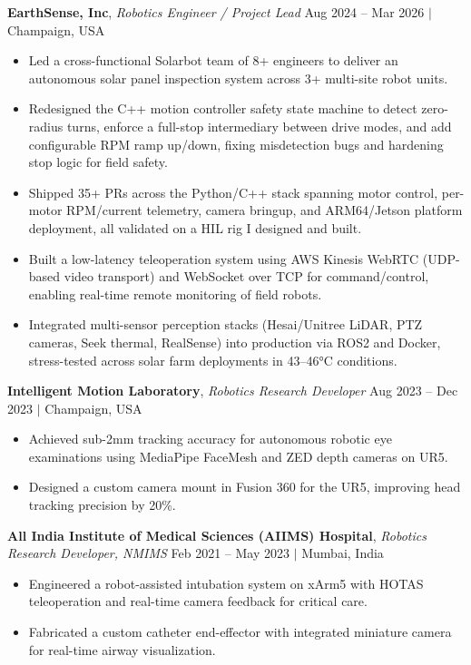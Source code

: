 \documentclass[9pt, a4paper]{article}
\newcommand{\workheader}[3]{%
  \textbf{#1}, \textit{#2} \hfill #3%
}
\begin{document}
\workheader{EarthSense, Inc}{Robotics Engineer / Project Lead}{Aug 2024 – Mar 2026 $|$ Champaign, USA}
\begin{itemize}[leftmargin=1.2em, topsep=2pt, itemsep=0pt, parsep=0pt]
  \item Led a cross-functional Solarbot team of 8+ engineers to deliver an autonomous solar panel inspection system across 3+ multi-site robot units.
  \item Redesigned the C++ motion controller safety state machine to detect zero-radius turns, enforce a full-stop intermediary between drive modes, and add configurable RPM ramp up/down, fixing misdetection bugs and hardening stop logic for field safety.
  \item Shipped 35+ PRs across the Python/C++ stack spanning motor control, per-motor RPM/current telemetry, camera bringup, and ARM64/Jetson platform deployment, all validated on a HIL rig I designed and built.
  \item Built a low-latency teleoperation system using AWS Kinesis WebRTC (UDP-based video transport) and WebSocket over TCP for command/control, enabling real-time remote monitoring of field robots.
  \item Integrated multi-sensor perception stacks (Hesai/Unitree LiDAR, PTZ cameras, Seek thermal, RealSense) into production via ROS2 and Docker, stress-tested across solar farm deployments in 43--46°C conditions.
\end{itemize}

\workheader{Intelligent Motion Laboratory}{Robotics Research Developer}{Aug 2023 – Dec 2023 $|$ Champaign, USA}
\begin{itemize}[leftmargin=1.2em, topsep=2pt, itemsep=0pt, parsep=0pt]
  \item Achieved sub-2mm tracking accuracy for autonomous robotic eye examinations using MediaPipe FaceMesh and ZED depth cameras on UR5.
  \item Designed a custom camera mount in Fusion 360 for the UR5, improving head tracking precision by 20\%.
\end{itemize}

\workheader{All India Institute of Medical Sciences (AIIMS) Hospital}{Robotics Research Developer, NMIMS}{Feb 2021 – May 2023 $|$ Mumbai, India}
\begin{itemize}[leftmargin=1.2em, topsep=2pt, itemsep=0pt, parsep=0pt]
  \item Engineered a robot-assisted intubation system on xArm5 with HOTAS teleoperation and real-time camera feedback for critical care.
  \item Fabricated a custom catheter end-effector with integrated miniature camera for real-time airway visualization.
\end{itemize}
\end{document}
